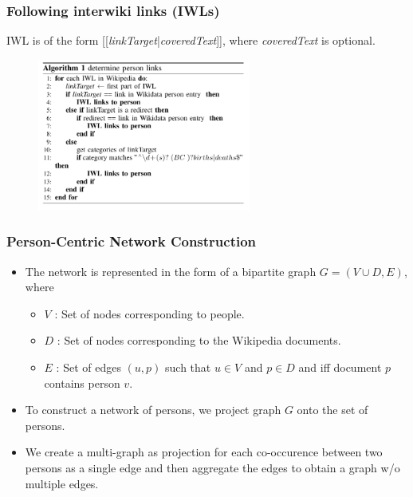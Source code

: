 \documentclass[9pt, compress]{beamer}
\begin{document}
\begin{frame}[fragile]
	\frametitle{Following interwiki links (IWLs)}
IWL is of the form [[\textit{linkTarget}|\textit{coveredText}]], where \textit{coveredText} is optional.
\begin{figure}
  \centering
 \includegraphics[width=7cm,height=5cm]{img/Algo1.png}
\end{figure}
\end{frame}

\begin{frame}[fragile]
	\frametitle{Person-Centric Network Construction}
\begin{itemize}
\item The network is represented in the form of a bipartite graph \(G = (V \cup D,E)\), where
\begin{itemize}
\item \(V\) : Set of nodes corresponding to people.
\item \(D\) : Set of nodes corresponding to the Wikipedia documents.
\item \(E\) : Set of edges \((u,p)\) such that \(u \in V\) and \(p \in D\) and iff document \(p\) contains person \(v\).
\end{itemize}
\item To construct a network of persons, we project graph \(G\) onto the set of persons.
\item We create a multi-graph as projection for each co-occurence between two persons as a single edge and then aggregate the edges to obtain a graph w/o multiple edges.
\end{itemize}
\end{frame}
\end{document}
